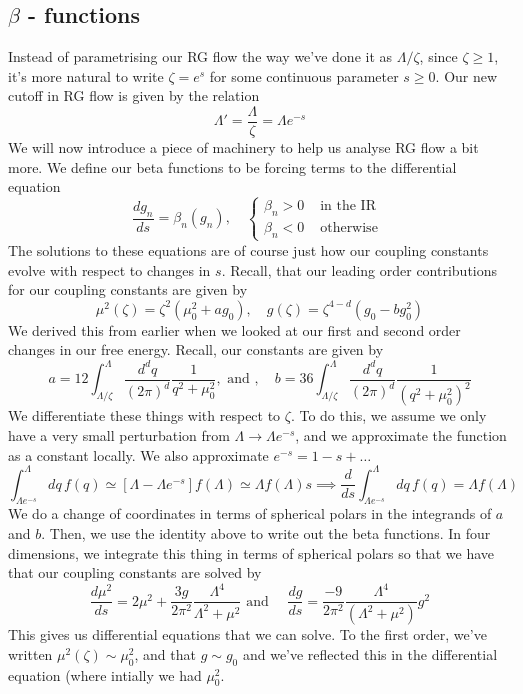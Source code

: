  \subsection{$ \beta$ - functions}
 Instead of parametrising our RG flow 
 the way we've done it as $ \Lambda / \zeta$,
 since  $ \zeta \geq 1 $, it's more natural 
 to write $ \zeta  = e^{ s } $ for some continuous parameter $ s \geq 0 $. 
 Our new cutoff in RG flow is given by the relation 
\[
 \Lambda ' = \frac{ \Lambda }{ \zeta  } = \Lambda e^{ - s }
\] We will now introduce a piece of 
machinery to help us analyse 
RG flow a bit more. We define our beta functions to be forcing 
terms to the differential equation 
\[
	\frac{ d g_ n }{ ds } = \beta_ n ( g _ n ) , \quad \begin{cases}
		\beta_ n > 0 & \text{ in the IR } \\
		\beta _ n < 0 & \text{ otherwise }
	\end{cases}
\] The solutions to these equations are 
of course just how our coupling constants evolve 
with respect to changes in $ s $. Recall, that our leading order 
contributions for our coupling constants are given by 
\[
 \mu ^ 2 ( \zeta ) = \zeta ^ 2 ( \mu _ 0 ^ 2  + ag_0 ), \quad
 g ( \zeta ) = \zeta ^{ 4 - d  } ( g_0 - b g_0^ 2 ) 
\] We derived this from earlier when we looked 
at our first and second order 
changes in our free energy. Recall, our constants are given by 
\[
	a = 12 \int_{ \Lambda / \zeta } ^ \Lambda \frac{  d^ d q }{ ( 2 \pi ) ^ d }
	\frac{1}{q ^ 2 + \mu _ 0 ^ 2}, \text{ and } , \quad
	b = 36 \int _{ \Lambda / \zeta } ^  \Lambda \frac{ d ^ d q }{ 
	( 2 \pi ) ^ d  } \frac{1}{( q ^ 2 + \mu _ 0 ^ 2 ) ^ 2 }
\] We differentiate these things with respect to $ \zeta $. 
To do this, we assume we only have a very small perturbation
from $ \Lambda \to \Lambda e^{ -s } $, and we approximate 
the function as a constant locally. We also approximate 
$ e ^{ - s}  = 1 - s + \dots $
\[
	\int _{ \Lambda e ^{ - s} } ^ \Lambda dq \, f ( q) 
	\simeq \left[  \Lambda - \Lambda e^{ - s}  \right] f ( \Lambda ) 
	\simeq \Lambda f ( \Lambda ) s \implies 
	\frac{ d }{ ds } \int _{ \Lambda e ^{ - s} } ^ \Lambda 
	dq \, f ( q ) = \Lambda f ( \Lambda ) 
\]  We do a change of coordinates 
in terms of spherical polars in the integrands 
of $ a $ and $ b  $. Then, we use the identity above 
to write out the beta functions. In four dimensions, we integrate this 
thing in terms of spherical polars so that 
we have that our coupling constants are solved by 
\[
 \frac{d \mu ^ 2 }{ ds } = 2 \mu ^ 2 + \frac{ 3g }{ 2 \pi ^ 2 } 
 \frac{ \Lambda ^ 4 }{ \Lambda ^ 2 + \mu ^ 2  } \text{ and } \quad
 \frac{ dg }{ ds } = \frac{ - 9 }{ 2 \pi ^ 2 } \frac{ \Lambda ^ 4 }{
 ( \Lambda ^ 2 + \mu ^ 2 ) } g ^ 2  
\] This gives us differential equations that 
we can solve. To the first order, we've written  
$ \mu ^ 2 ( \zeta ) \sim \mu ^ 2 _ 0 $, and that $ g  \sim g_0 $ and we've 
reflected this in the differential equation 
(where intially we had $ \mu ^ 2 _ 0 $.  


